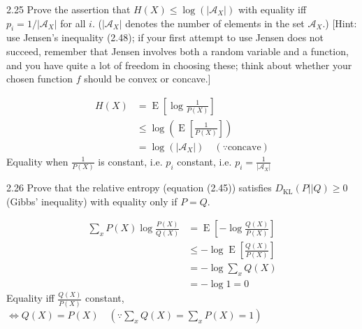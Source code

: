\documentclass[12pt, a4paper]{article}
\begin{document}
\begin{prob}{2.25}
    Prove the assertion that $H(X) \leq \log(|\mathcal{A}_X|)$ with equality iff $p_i = 1/|\mathcal{A}_X|$ for all $i$. ($|\mathcal{A}_X|$ denotes the number of elements in the set $\mathcal{A}_X$.) [Hint: use Jensen's inequality (2.48); if your first attempt to use Jensen does not succeed, remember that Jensen involves both a random variable and a function, and you have quite a lot of freedom in choosing these; think about whether your chosen function $f$ should be convex or concave.]
\end{prob}
\begin{sol}
    \begin{align*}
        H(X) &= \operatorname{E}\left[\log \frac{1}{P(X)} \right] \\
        & \leq \log (\operatorname{E}\left[\frac{1}{P(X)} \right]) \\
        &= \log (|\mathcal{A}_X|) \quad (\because \text{concave})
    \end{align*}
    Equality when $\frac{1}{P(X)}$ is constant, i.e. $p_i$ constant, i.e. $p_i = \frac{1}{|\mathcal{A}_X|}$
\end{sol}
\bigskip

\begin{prob}{2.26}
    Prove that the relative entropy (equation (2.45)) satisfies $D_{\text{KL}}(P||Q) \geq 0$ (Gibbs' inequality) with equality only if $P = Q$.
\end{prob}
\begin{sol}
    \begin{align*}
    \sum_{x}P(X) \log \frac{P(X)}{Q(X)} &= \operatorname{E}\left[-\log \frac{Q(X)}{P(X)}\right] \\
    &\leq -\log \operatorname{E}\left[\frac{Q(X)}{P(X)}\right] \\
    &= -\log \sum_{x} Q(X) \\
    &= -\log 1 = 0
    \end{align*}
Equality iff $\frac{Q(X)}{P(X)}$ constant, \\
$\iff Q(X) = P(X) \quad (\because \sum_{x} Q(X) = \sum_{x} P(X) = 1)$
\end{sol}
\bigskip
\end{document}
